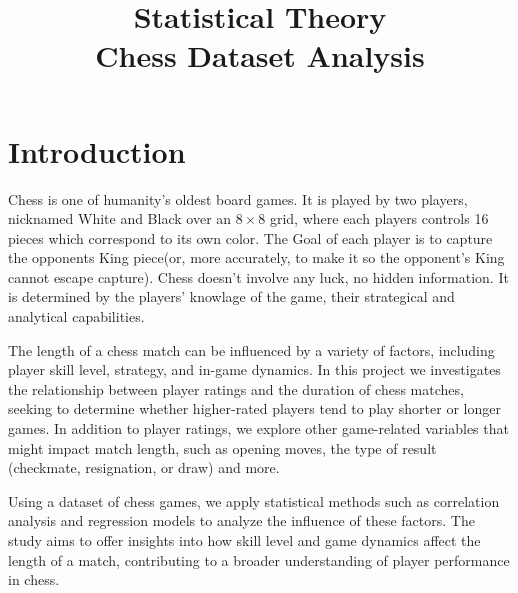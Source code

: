 \documentclass[conference]{IEEEtran}
\title{
Statistical Theory\\
Chess Dataset Analysis
}
\author{
   \IEEEauthorblockN{Dor Boker, Itamar Nakar}
   \IEEEauthorblockA{
      I.D: , 325829000\\
      Email: , itamar.nakar@gmail.com
   }
}
\begin{document}
\maketitle

\section{Introduction}
Chess is one of humanity's oldest board games. It is played by two players, nicknamed White and Black over an $8\times8$ grid, where each players controls 16 pieces which correspond to its own color. The Goal of each player is to capture the opponents King piece(or, more accurately, to make it so the opponent's King cannot escape capture). Chess doesn't involve any luck, no hidden information. It is determined by the players' knowlage of the game, their strategical and analytical capabilities.

The length of a chess match can be influenced by a variety of factors, including player skill level, strategy, and in-game dynamics. In this project we investigates the relationship between player ratings and the duration of chess matches, seeking to determine whether higher-rated players tend to play shorter or longer games. In addition to player ratings, we explore other game-related variables that might impact match length, such as opening moves, the type of result (checkmate, resignation, or draw) and more.

Using a dataset of chess games, we apply statistical methods such as correlation analysis and regression models to analyze the influence of these factors. The study aims to offer insights into how skill level and game dynamics affect the length of a match, contributing to a broader understanding of player performance in chess.
\end{document}

